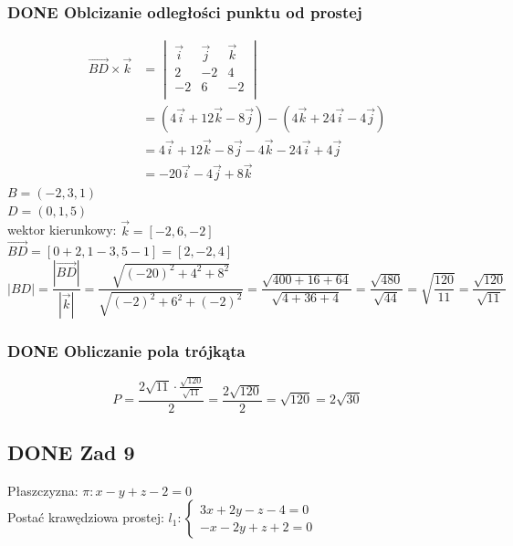 \documentclass[11pt]{article}
\begin{document}
\subsubsection{{\bfseries\sffamily DONE} Oblcizanie odległości punktu od prostej}
\label{sec:orged3276a}
\begin{align*}
  \overrightarrow{BD} \times \vec{k}
  &= \begin{vmatrix}
       \vec{i} & \vec{j} & \vec{k}\\
       2 & -2 & 4\\
       -2 & 6 & -2\\
     \end{vmatrix}
  \\
  &= (4\vec{i} + 12\vec{k} - 8 \vec{j}) - (4 \vec{k} + 24 \vec{i} - 4 \vec{j})
  \\
  &= 4\vec{i} + 12\vec{k} - 8 \vec{j} - 4 \vec{k} - 24 \vec{i} + 4 \vec{j}
  \\
  &= -20\vec{i} - 4\vec{j} + 8 \vec{k}
\end{align*}
\(B=(-2,3,1)\)
\\\empty
\(D=(0, 1, 5)\)
\\\empty
wektor kierunkowy: \(\vec{k} = [-2, 6, -2]\)
\\\empty
\(\overrightarrow{BD} = [0 + 2 , 1 - 3 ,5 -1] = [2, -2, 4]\)
\\\empty
$$|BD| = \frac{|\overrightarrow{BD}|}{|\vec{k}|}
= \frac{\sqrt{(-20)^{2} + 4^{2} + 8^{2}}}
{\sqrt{(-2)^{2} + 6^{2} + (-2)^{2}} }
= \frac{\sqrt{400 + 16 + 64}}{\sqrt{4 + 36 + 4}}
= \frac{\sqrt{480}}{\sqrt{44}}
= \sqrt{\frac{120}{11}}
= \frac{\sqrt{120}}{\sqrt{11}}$$
\subsubsection{{\bfseries\sffamily DONE} Obliczanie pola trójkąta}
\label{sec:org220671d}
$$P = \frac{ 2\sqrt{11} \cdot\frac{ \sqrt{120} }{\sqrt{11}} }
{2}
= \frac{2\sqrt{120}}{2}
= \sqrt{120}
= 2\sqrt{30}$$
\subsection{{\bfseries\sffamily DONE} Zad 9}
\label{sec:org63edd59}
Płaszczyzna: \(\pi : x - y + z - 2 = 0\)
\\\empty
Postać krawędziowa prostej:
\(l_1 : \begin{cases}
3x + 2y - z - 4 = 0\\
-x - 2y + z + 2 = 0
\end{cases}\)
\end{document}
